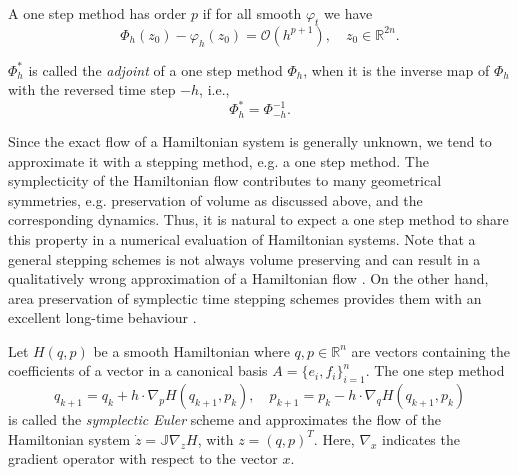 \begin{definition}
A one step method has order $p$ if for all smooth $\varphi_t$ we have
\begin{equation} \label{eq:2.23}
	\Phi_h(z_0) - \varphi_h(z_0) = \mathcal O(h^{p+1}), \quad z_0 \in \mathbb R^{2n}.
\end{equation}
\end{definition}

\begin{definition}
	$\Phi_h^*$ is called the \emph{adjoint} of a one step method $\Phi_h$, when it is the inverse map of $\Phi_h$ with the reversed time step $-h$, i.e.,
\begin{equation} \label{eq:2.24}
	\Phi_h^* = \Phi^{-1}_{-h}.
\end{equation}
\end{definition}

Since the exact flow of a Hamiltonian system is generally unknown, we tend to approximate it with a stepping method, e.g. a one step method. The symplecticity of the Hamiltonian flow contributes to many geometrical symmetries, e.g. preservation of volume as discussed above, and the corresponding dynamics. Thus, it is natural to expect a one step method to share this property in a numerical evaluation of Hamiltonian systems. Note that a general stepping schemes is not always volume preserving and can result in a qualitatively wrong approximation of a Hamiltonian flow \cite{hairer2006geometric}. On the other hand, area preservation of symplectic time stepping schemes provides them with an excellent long-time behaviour \cite{hairer2006geometric,blanes2016concise}.

\begin{definition}
Let $H(q,p)$ be a smooth Hamiltonian where $q,p\in\mathbb R^{n}$ are vectors containing the coefficients of a vector in a canonical basis $A = \{ e_i,f_i\}_{i=1}^n$. The one step method
\begin{equation}
	q_{k+1} = q_k + h \cdot \nabla_p H(q_{k+1},p_k),\quad p_{k+1} = p_k - h \cdot \nabla_q H(q_{k+1},p_k)
\end{equation}
is called the \emph{symplectic Euler} scheme and approximates the flow of the Hamiltonian system $\dot z = \mathbb J \nabla_z H$, with $z=(q,p)^T$. Here, $\nabla_x$ indicates the gradient operator with respect to the vector $x$.
\end{definition}

